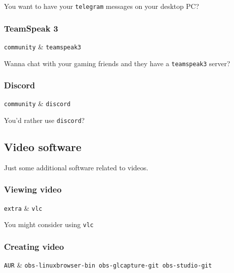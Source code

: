\documentclass[10pt]{dustdoc}
\begin{document}
You want to have your \texttt{telegram} messages on your desktop PC?

\subsubsection{TeamSpeak 3}
\label{sec:teamspeak-3}

\begin{packagetable}
    \texttt{community} & \texttt{teamspeak3} \\ 
\end{packagetable}

Wanna chat with your gaming friends and they have a \texttt{teamspeak3} server?

\subsubsection{Discord}
\label{sec:discord}

\begin{packagetable}
    \texttt{community} & \texttt{discord} \\ 
\end{packagetable}

You’d rather use \texttt{discord}?

\subsection{Video software}
\label{sec:gui-video-software}

Just some additional software related to videos.

\subsubsection{Viewing video}
\label{sec:viewing-video}

\begin{packagetable}
    \texttt{extra} & \texttt{vlc} \\ 
\end{packagetable}

You might consider using \texttt{vlc}

\subsubsection{Creating video}
\label{sec:creating-video}

\begin{packagetable}
    \texttt{AUR} & \texttt{obs-linuxbrowser-bin obs-glcapture-git obs-studio-git} \\ 
\end{packagetable}
\end{document}
